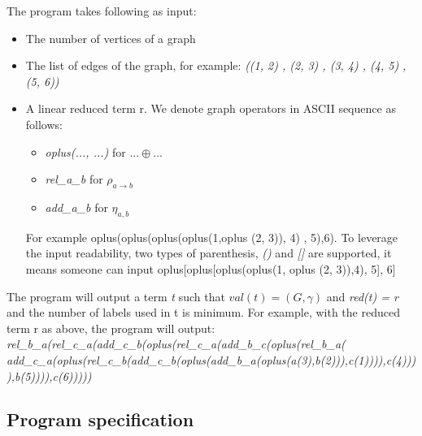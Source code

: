\documentclass[a4paper, 12pt]{article}
\begin{document}
The program takes following as input: 
\begin{itemize}
\item The number of vertices of a graph
\item The list of edges of the graph, for example: \textit {((1, 2) , (2, 3) , (3, 4) , (4, 5) , (5, 6))}
\item A linear reduced term r. We denote graph operators in ASCII sequence as follows:
\begin{itemize}
\item \textit {oplus(..., ...)} for $...\oplus...$
\item \textit {rel\_a\_b} for $\rho_{a\rightarrow b}$
\item \textit {add\_a\_b} for $\eta_{a,b}$
\end{itemize}

For example\textit { }oplus(oplus(oplus(oplus(1,oplus (2, 3)), 4) , 5),6). To leverage the input readability, two types of parenthesis, \textit {()} and \textit {{[}{]}} are supported, it means someone can input oplus{[}oplus{[}oplus(oplus(1, oplus (2, 3)),4), 5{]}, 6{]}
\end{itemize}

The program will output a term \textit t such that \textit {$val(t)=(G,\gamma)$} and \textit {red(t) = r} and the number of labels used in t is minimum. For example, with the reduced term r as above, the program will output: \textit{rel\_b\_a(rel\_c\_a(add\_c\_b(oplus(rel\_c\_a(add\_b\_c(oplus(rel\_b\_a(\\
add\_c\_a(oplus(rel\_c\_b(add\_c\_b(oplus(add\_b\_a(oplus(a(3),b(2))),c(1)))),c(4)))),b(5)))),c(6)))))}

\subsection{Program specification}
\end{document}
